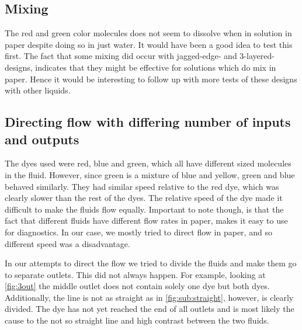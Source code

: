 \subsection{Mixing}
The red and green color molecules does not seem to dissolve when in solution in paper despite doing so in just water. It would have been a good idea to test this first. The fact that some mixing did occur with jagged-edge- and 3-layered-designs, indicates that they might be effective for solutions which do mix in paper. Hence it would be interesting to follow up with more tests of these designs with other liquids.

\subsection{Directing flow with differing number of inputs and outputs}
The dyes used were red, blue and green, which all have different sized molecules in the fluid. However, since green is a mixture of blue and yellow, green and blue behaved similarly. They had similar speed relative to the red dye, which was clearly slower than the rest of the dyes. The relative speed of the dye made it difficult to make the fluids flow equally. Important to note though, is that the fact that different fluids have different flow rates in paper, makes it easy to use for diagnostics. In our case, we mostly tried to direct flow in paper, and so different speed was a disadvantage.

In our attempts to direct the flow we tried to divide the fluids and make them go to separate outlets. This did not always happen. For example, looking at \ref{fig:3out} the middle outlet does not contain solely one dye but both dyes. Additionally, the line is not as straight as in \ref{fig:sub:straight}, however, is clearly divided. The dye has not yet reached the end of all outlets and is most likely the cause to the not so straight line and high contrast between the two fluids.
